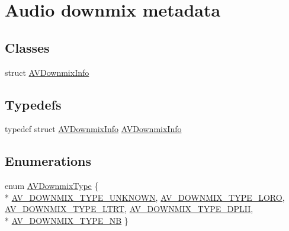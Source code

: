 \hypertarget{group__downmix__info}{}\section{Audio downmix metadata}
\label{group__downmix__info}
\subsection*{Classes}
\begin{DoxyCompactItemize}
\item 
struct \hyperlink{struct_a_v_downmix_info}{A\+V\+Downmix\+Info}
\end{DoxyCompactItemize}
\subsection*{Typedefs}
\begin{DoxyCompactItemize}
\item 
typedef struct \hyperlink{struct_a_v_downmix_info}{A\+V\+Downmix\+Info} \hyperlink{group__downmix__info_gab59cbb1e2ec3e26184533e5f67a89128}{A\+V\+Downmix\+Info}
\end{DoxyCompactItemize}
\subsection*{Enumerations}
\begin{DoxyCompactItemize}
\item 
enum \hyperlink{group__downmix__info_ga3e3654fedbe3e5485f00ea09396c3521}{A\+V\+Downmix\+Type} \{ \\*
\hyperlink{group__downmix__info_gga3e3654fedbe3e5485f00ea09396c3521a1184863af0dcd15f6851f2db10fa355c}{A\+V\+\_\+\+D\+O\+W\+N\+M\+I\+X\+\_\+\+T\+Y\+P\+E\+\_\+\+U\+N\+K\+N\+O\+WN}, 
\hyperlink{group__downmix__info_gga3e3654fedbe3e5485f00ea09396c3521a63e63739b6ea34a5ec073ad6ead25f8e}{A\+V\+\_\+\+D\+O\+W\+N\+M\+I\+X\+\_\+\+T\+Y\+P\+E\+\_\+\+L\+O\+RO}, 
\hyperlink{group__downmix__info_gga3e3654fedbe3e5485f00ea09396c3521a3737f8fe65fe8b805b256efa8d1328ef}{A\+V\+\_\+\+D\+O\+W\+N\+M\+I\+X\+\_\+\+T\+Y\+P\+E\+\_\+\+L\+T\+RT}, 
\hyperlink{group__downmix__info_gga3e3654fedbe3e5485f00ea09396c3521ac92fde94fbc0aa50b93071d995a36fca}{A\+V\+\_\+\+D\+O\+W\+N\+M\+I\+X\+\_\+\+T\+Y\+P\+E\+\_\+\+D\+P\+L\+II}, 
\\*
\hyperlink{group__downmix__info_gga3e3654fedbe3e5485f00ea09396c3521ae8e1a1a755fccdddddbc9680694af182}{A\+V\+\_\+\+D\+O\+W\+N\+M\+I\+X\+\_\+\+T\+Y\+P\+E\+\_\+\+NB}
 \}
\end{DoxyCompactItemize}
